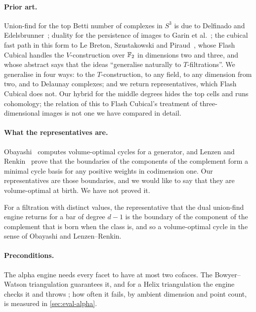 \paragraph{Prior art.}
Union-find for the top Betti number of complexes in $S^3$ is due to Delfinado and Edelsbrunner~\cite{delfinado1995incremental};
duality for the persistence of images to Garin et al.~\cite{garin2020duality}; the cubical fast path in this form to Le Breton,
Szustakowski and Piraud~\cite{lebreton2026flash}, whose Flash Cubical handles the $V$-construction over $\mathbb{F}_2$ in dimensions
two and three, and whose abstract says that the ideas ``generalise naturally to $T$-filtrations''. We generalise in
four ways: to the $T$-construction, to any field, to any dimension from two, and to Delaunay complexes; and we return
representatives, which Flash Cubical does not. Our hybrid for the middle degrees hides the top cells and runs cohomology; the
relation of this to Flash Cubical's treatment of three-dimensional images is not one we have compared in detail.

\paragraph{What the representatives are.}
Obayashi~\cite{obayashi2018volume} computes volume-optimal cycles for a generator, and Lenzen and
Renkin~\cite{lenzen2025codim1} prove that the boundaries of the components of the complement form a minimal cycle basis for
any positive weights in codimension one. Our representatives are those boundaries, and we would like to say that they are
volume-optimal at birth. We have not proved it.
\begin{conjecture}\label{conj:volume}
For a filtration with distinct values, the representative that the dual union-find engine returns for a bar of degree $d-1$ is
the boundary of the component of the complement that is born when the class is, and so a volume-optimal cycle in the sense of
Obayashi and Lenzen--Renkin.
\end{conjecture}
\paragraph{Preconditions.}
The alpha engine needs every facet to have at most two cofaces. The Bowyer--Watson triangulation guarantees it, and for a
Helix triangulation the engine checks it and throws ; how often it fails, by ambient
dimension and point count, is measured in \cref{sec:eval-alpha}.

